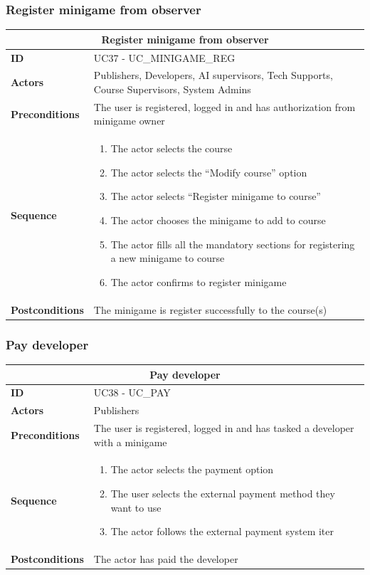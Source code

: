 \subsubsection{Register minigame from observer}
\begin{tabular}{|m{2.5cm}|m{8cm}|}
	\hline
	\multicolumn{2}{|c|}{Register minigame from observer} \\
	\hline
	\textbf{ID} & UC37 - UC\_MINIGAME\_REG \\
	\hline
	\textbf{Actors} & Publishers, Developers, AI supervisors, Tech Supports, Course Supervisors, System Admins \\
	\hline
	\textbf{Preconditions} & The user is registered, logged in and has authorization from minigame owner \\
	\hline
	\textbf{Sequence} & 
	\begin{enumerate}
		\item The actor selects the course
		\item The actor selects the “Modify course” option
		\item The actor selects “Register minigame to course”
		\item The actor chooses the minigame to add to course
		\item The actor fills all the mandatory sections for registering a new minigame to course
		\item The actor confirms to register minigame
	\end{enumerate} \\
	\hline
	\textbf{Postconditions} & The minigame is register successfully to the course(s) \\
	\hline
\end{tabular}

\subsubsection{Pay developer}
\begin{tabular}{|m{2.5cm}|m{8cm}|}
	\hline
	\multicolumn{2}{|c|}{Pay developer} \\
	\hline
	\textbf{ID} & UC38 - UC\_PAY \\
	\hline
	\textbf{Actors} & Publishers \\
	\hline
	\textbf{Preconditions} & The user is registered, logged in and has tasked a developer with a minigame \\
	\hline
	\textbf{Sequence} & 
	\begin{enumerate}
		\item The actor selects the payment option
		\item The user selects the external payment method they want to use
		\item The actor follows the external payment system iter
	\end{enumerate} \\
	\hline
	\textbf{Postconditions} & The actor has paid the developer \\
	\hline
\end{tabular}

